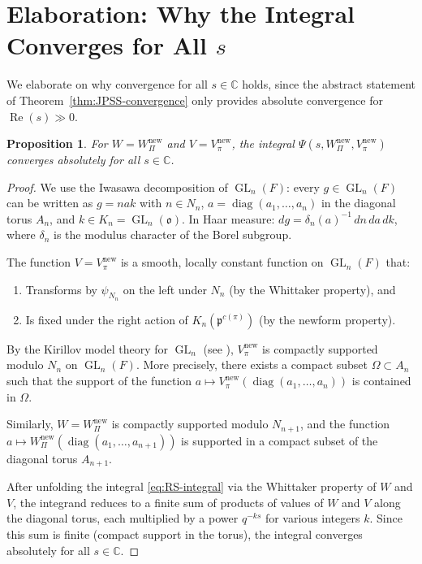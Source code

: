 \documentclass[12pt]{article}
\newtheorem{proposition}[theorem]{Proposition}
\theoremstyle{definition}
\DeclareMathOperator{\GL}{GL}
\DeclareMathOperator{\diag}{diag}
\DeclareMathOperator{\Re}{Re}
\begin{document}
\section{Elaboration: Why the Integral Converges for All $s$}
\label{sec:convergence-all-s}

We elaborate on why convergence for all $s \in \mathbb{C}$ holds,
since the abstract statement of Theorem~\ref{thm:JPSS-convergence} only
provides absolute convergence for $\Re(s) \gg 0$.

\begin{proposition}
\label{prop:entire}
For $W = W_\Pi^{\mathrm{new}}$ and $V = V_\pi^{\mathrm{new}}$, the integral
$\Psi(s, W_\Pi^{\mathrm{new}}, V_\pi^{\mathrm{new}})$ converges absolutely for
all $s \in \mathbb{C}$.
\end{proposition}

\begin{proof}
We use the Iwasawa decomposition of $\GL_n(F)$: every $g \in \GL_n(F)$ can
be written as $g = nak$ with $n \in N_n$, $a = \diag(a_1,\ldots,a_n)$ in the
diagonal torus $A_n$, and $k \in K_n = \GL_n(\mathfrak{o})$.  In Haar measure:
$dg = \delta_n(a)^{-1}\,dn\,da\,dk$, where $\delta_n$ is the modulus character
of the Borel subgroup.

The function $V = V_\pi^{\mathrm{new}}$ is a smooth, locally constant function
on $\GL_n(F)$ that:
\begin{enumerate}
\item Transforms by $\psi_{N_n}$ on the left under $N_n$ (by the Whittaker
  property), and
\item Is fixed under the right action of $K_n(\mathfrak{p}^{c(\pi)})$ (by the
  newform property).
\end{enumerate}
By the Kirillov model theory for $\GL_n$ (see \cite[Chapter~2]{BZ}), $V_\pi^{\mathrm{new}}$
is compactly supported modulo $N_n$ on $\GL_n(F)$.  More precisely, there exists
a compact subset $\Omega \subset A_n$ such that the support of the function
$a \mapsto V_\pi^{\mathrm{new}}(\diag(a_1,\ldots,a_n))$ is contained in $\Omega$.

Similarly, $W = W_\Pi^{\mathrm{new}}$ is compactly supported modulo $N_{n+1}$,
and the function $a \mapsto W_\Pi^{\mathrm{new}}(\diag(a_1,\ldots,a_{n+1}))$
is supported in a compact subset of the diagonal torus $A_{n+1}$.

After unfolding the integral \eqref{eq:RS-integral} via the Whittaker
property of $W$ and $V$, the integrand reduces to a finite sum of products
of values of $W$ and $V$ along the diagonal torus, each multiplied by a power
$q^{-ks}$ for various integers $k$.  Since this sum is finite (compact support
in the torus), the integral converges absolutely for all $s \in \mathbb{C}$.
\end{proof}
\end{document}
